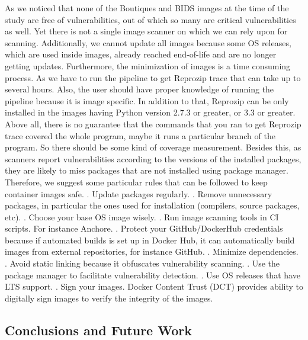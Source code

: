 \documentclass[a4paper,num-refs]{oup-contemporary}
\begin{document}
As we noticed that none of the Boutiques and BIDS images at the time of the study are free of vulnerabilities, out of which
so many are critical vulnerabilities as well. Yet there is not a single image scanner on which we can rely upon for
scanning. Additionally, we cannot update all images because some OS releases, which are used inside images, 
already reached end-of-life and are
no longer getting updates. Furthermore, the minimization of images is a time consuming process. As we have to run
the pipeline to get Reprozip trace that can take up to several hours. Also, the user should have proper knowledge
of running the pipeline because it is image specific. In addition to that, Reprozip can be only installed
in the images having Python version 2.7.3 or greater, or 3.3 or greater. Above all, there is no guarantee that
the commands that you ran to get Reprozip trace covered the whole program, maybe it runs a particular
branch of the program. So there should be some kind of coverage measurement.
Besides this, as scanners report vulnerabilities according to the versions of the installed packages,
they are likely to miss packages that are not installed using package manager. 
Therefore, we suggest some particular rules that can be
followed to keep container images safe.
. Update packages regularly.
. Remove unnecessary packages, in particular the ones used for installation (compilers, source packages, etc).
. Choose your base OS image wisely.
. Run image scanning tools in CI scripts. For instance Anchore.
. Protect your GitHub/DockerHub credentials because if automated builds is set up
in Docker Hub, it can automatically build images from external repositories, for instance GitHub.
. Minimize dependencies.
. Avoid static linking because it obfuscates vulnerability scanning.
. Use the package manager to facilitate vulnerability detection.
. Use OS releases that have LTS support.
. Sign your images. Docker Content Trust (DCT) provides ability to digitally sign
images to verify the integrity of the images.

\subsection{Conclusions and Future Work}
\end{document}

